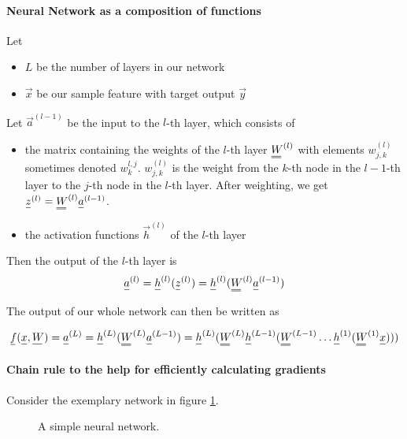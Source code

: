 \paragraph*{Neural Network as a composition of functions} Let
\begin{itemize}
    \item $L$ be the number of layers in our network
    \item $\vec{x}$ be our sample feature with target output $\vec{y}$
\end{itemize}
Let $\vec{a}^{(l-1)}$ be the input to the $l$-th layer, which consists of
\begin{itemize}
    \item the matrix containing the weights of the $l$-th layer $\mat{W}^{(l)}$ with elements
    $w_{j,k}^{(l)}$ sometimes denoted $w_k^{l,j}$. $w_{j,k}^{(l)}$ is the weight from the $k$-th node in the $l-1$-th layer to the $j$-th node in the $l$-th layer.
    After weighting, we get $\vec{z}^{(l)} = \mat{W}^{(l)} \vec{a}^{(l-1)}$.
    \item the activation functions $\vec{h}^{(l)}$ of the $l$-th layer
\end{itemize}
Then the output of the $l$-th layer is
\begin{equation}
    \vec{a}^{(l)} = \vec{h}^{(l)}(\vec{z}^{(l)}) = \vec{h}^{(l)}(\mat{W}^{(l)} \vec{a}^{(l-1)})
\end{equation}

The output of our whole network can then be written as

\begin{equation}
    \vec{f}(\vec{x}, \vec{W}) = \vec{a}^{(L)} = \vec{h}^{(L)}(\mat{W}^{(L)} \vec{a}^{(L-1)}) = \vec{h}^{(L)}(\mat{W}^{(L)} \vec{h}^{(L-1)}(\mat{W}^{(L-1)} \dots \vec{h}^{(1)}(\mat{W}^{(1)} \vec{x})))
\end{equation}

\paragraph*{Chain rule to the help for efficiently calculating gradients} Consider the
exemplary network in figure \ref{fig:nn_simple}.

\begin{figure}[!htb]
    \centering
    
    \caption{A simple neural network.}
    \label{fig:nn_simple}
\end{figure}


